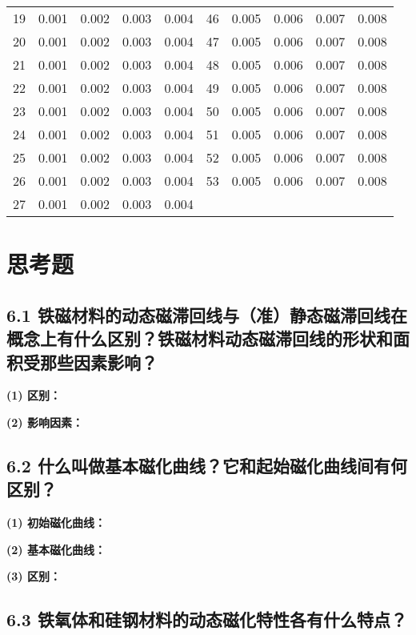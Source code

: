 \documentclass[UTF8]{article}
\theoremstyle{MyLineTheoremStyle} %
\theoremstyle{MyBlockTheoremStyle} %
\theoremstyle{MySubsubsectionStyle} %
\begin{document}
\begin{table}[H]
{\begin{tabular}{|c|cccc|c|cccc|}
    19	& 0.001 &0.002 	&0.003	&0.004	&46	&0.005	&0.006  &0.007 & 0.008 \\
    20	& 0.001 &0.002 	&0.003	&0.004	&47	&0.005	&0.006  &0.007 & 0.008 \\
    21	& 0.001 &0.002 	&0.003	&0.004	&48	&0.005	&0.006  &0.007 & 0.008 \\
    22	& 0.001 &0.002 	&0.003	&0.004	&49	&0.005	&0.006  &0.007 & 0.008 \\
    23	& 0.001 &0.002 	&0.003	&0.004	&50	&0.005	&0.006  &0.007 & 0.008 \\
    24	& 0.001 &0.002 	&0.003	&0.004	&51	&0.005	&0.006	&0.007 & 0.008 \\
    25	& 0.001 &0.002 	&0.003	&0.004	&52	&0.005	&0.006	&0.007 & 0.008 \\
    26	& 0.001 &0.002 	&0.003	&0.004	&53	&0.005	&0.006	&0.007 & 0.008 \\
    27	& 0.001 &0.002 	&0.003	&0.004	&	&		&	    &      &       \\
    \hline
\end{tabular}}
\end{table}

\section{思考题}

\subsection*{6.1 铁磁材料的动态磁滞回线与（准）静态磁滞回线在概念上有什么区别？铁磁材料动态磁滞回线的形状和面积受那些因素影响？}


\noindent \textbf{(1) 区别：}

\noindent \textbf{(2) 影响因素：}



\subsection*{6.2 什么叫做基本磁化曲线？它和起始磁化曲线间有何区别？}

\noindent\textbf{(1) 初始磁化曲线：}


\noindent\textbf{(2) 基本磁化曲线：}

\noindent\textbf{(3) 区别：}



\subsection*{6.3 铁氧体和硅钢材料的动态磁化特性各有什么特点？}
\end{document}
